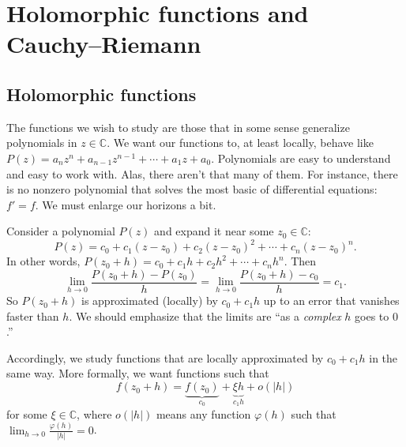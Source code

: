 \documentclass[12pt,openany]{book}
\newcommand{\glsadd}[2][]{}
\newcommand{\sabs}[1]{\lvert {#1} \rvert}
\newcommand{\C}{{\mathbb{C}}}
\newcommand{\myquote}[1]{``#1''}
\theoremstyle{plain}
\theoremstyle{remark}
\theoremstyle{definition}
\theoremstyle{exercise}
\theoremstyle{example}
\begin{document}

\section{Holomorphic functions and Cauchy--Riemann}
\label{sec:holfuncs}

\subsection{Holomorphic functions}

The functions we wish to study are those that in some sense
generalize polynomials in $z \in \C$.
We want our functions to,
at least locally, behave like $P(z) = a_n z^n + a_{n-1} z^{n-1} + \cdots +
a_1 z + a_0$.  Polynomials are easy to understand and easy to work
with.  Alas, there aren't that many of them.  For instance, there is
no nonzero polynomial that solves the most basic of differential equations: $f' =
f$.  We must enlarge our horizons a bit.

Consider a polynomial $P(z)$ and expand it near some $z_0 \in \C$:
\begin{equation*}
P(z) = c_0 + c_1 (z-z_0) + c_2 {(z-z_0)}^2 + \cdots + c_n {(z-z_0)}^n .
\end{equation*}
In other words, $P(z_0+h) = c_0 + c_1 h + c_2 h^2 + \cdots + c_n h^n$.
Then
\begin{equation*}
\lim_{h \to 0} \frac{P(z_0+h) - P(z_0)}{h} =
\lim_{h \to 0} \frac{P(z_0+h) - c_0}{h} = c_1 .
\end{equation*}
So $P(z_0+h)$ is approximated (locally) by $c_0 + c_1 h$
up to an error that vanishes faster than $h$.
We should emphasize that the limits are \myquote{as a \emph{complex} $h$
goes to $0$.}

Accordingly, we study functions that are
locally approximated by $c_0 + c_1 h$ in the same way.  More formally,
we want functions such that
\begin{equation*}
f(z_0+h) = \underbrace{f(z_0)}_{c_0} + \underbrace{\xi h}_{c_1 h} + o(\sabs{h})
\end{equation*}
for some $\xi \in \C$, where
\glsadd{not:oofh}%
$o(\sabs{h})$ means any
function $\varphi(h)$ such that
$\lim_{h\to0} \frac{\varphi(h)}{\sabs{h}} = 0$.
\end{document}
